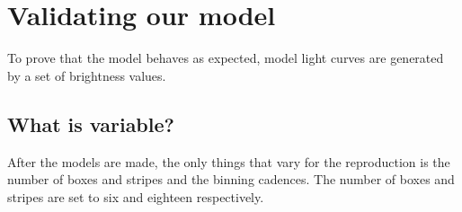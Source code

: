 

\section{Validating our model \label{validation}}
To prove that the model behaves as expected, model light curves are generated by a set of brightness values.
\subsection{What is variable? \label{variable}}
After the models are made, the only things that vary for the reproduction is the number of boxes and stripes and the binning cadences. The number of boxes and stripes are set to six and eighteen respectively.  %

